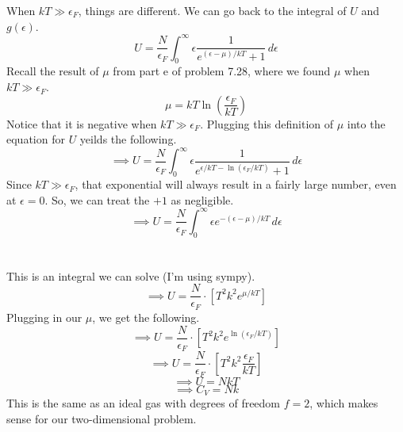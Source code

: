 \documentclass[12pt]{article}
\begin{document}
\begin{flushleft}
When $kT\gg\epsilon_F$, things are different.
We can go back to the integral of $U$ and $g(\epsilon)$.
$$U=\frac{N}{\epsilon_F}\int_0^\infty\epsilon\frac{1}{e^{(\epsilon-\mu)/kT}+1}\,d\epsilon$$
Recall the result of $\mu$ from part e of problem 7.28, where we found $\mu$ when $kT\gg\epsilon_F$.
$$\mu=kT\ln\left(\frac{\epsilon_F}{kT}\right)$$
Notice that it is negative when $kT\gg\epsilon_F$.
Plugging this definition of $\mu$ into the equation for $U$ yeilds the following.
$$\implies U=\frac{N}{\epsilon_F}\int_0^\infty\epsilon\frac{1}{e^{\epsilon/kT-\ln(\epsilon_F/kT)}+1}\,d\epsilon$$
Since $kT\gg\epsilon_F$, that exponential will always result in a fairly large number, even at $\epsilon=0$.
So, we can treat the $+1$ as negligible.
$$\implies U=\frac{N}{\epsilon_F}\int_0^\infty\epsilon e^{-(\epsilon-\mu)/kT}\,d\epsilon$$\\~\\

This is an integral we can solve (I'm using sympy).\\
$$\implies U=\frac{N}{\epsilon_F}\cdot\left[T^2k^2e^{\mu/kT}\right]$$
Plugging in our $\mu$, we get the following.
$$\implies U=\frac{N}{\epsilon_F}\cdot\left[T^2k^2e^{\ln(\epsilon_F/kT)}\right]$$
$$\implies U=\frac{N}{\epsilon_F}\cdot\left[T^2k^2\frac{\epsilon_F}{kT}\right]$$
$$\implies U=NkT$$
$$\implies C_V=Nk$$
This is the same as an ideal gas with degrees of freedom $f=2$, which makes sense for our two-dimensional problem.




\end{flushleft}
\end{document}
